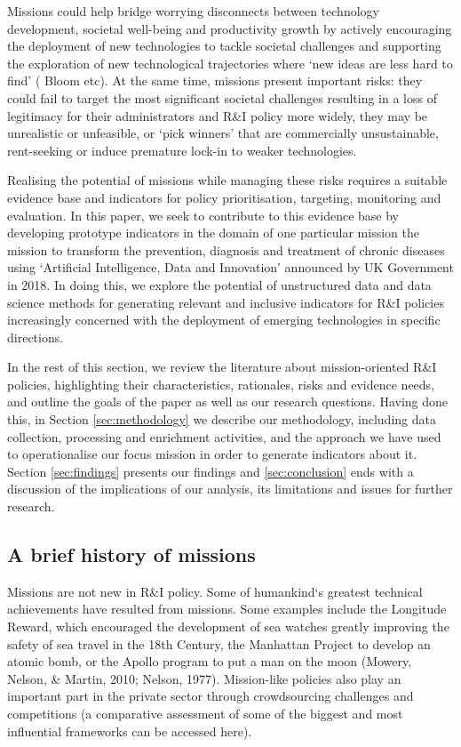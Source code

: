 \documentclass[11pt]{article}
\begin{document}
Missions could help bridge worrying disconnects between technology development, societal well-being and productivity growth by actively encouraging the deployment of new technologies to tackle societal challenges and supporting the exploration of new technological trajectories where `new ideas are less hard to find' ( Bloom etc). At the same time, missions present important risks: they could fail to target the most significant societal challenges resulting in a loss of legitimacy for their administrators and R\&I policy more widely, they may be unrealistic or unfeasible, or `pick winners' that are commercially unsustainable, rent-seeking or induce premature lock-in to weaker technologies. 

Realising the potential of missions while managing these risks requires a suitable evidence base and indicators for policy prioritisation, targeting, monitoring and evaluation. In this paper, we seek to contribute to this evidence base by developing prototype indicators in the domain of one particular mission \- the mission to transform the prevention, diagnosis and treatment of chronic diseases using `Artificial Intelligence, Data and Innovation' announced by UK Government in 2018. In doing this, we explore the potential of unstructured data and data science methods for generating relevant and inclusive indicators for R\&I policies increasingly concerned with the deployment of emerging technologies in specific directions. 

In the rest of this section, we review the literature about mission-oriented R\&I policies, highlighting their characteristics, rationales, risks and evidence needs, and outline the goals of the paper as well as our research questions. Having done this, in Section \ref{sec:methodology} we describe our methodology, including data collection, processing and enrichment activities, and the approach we have used to operationalise our focus mission in order to generate indicators about it. Section \ref{sec:findings} presents our findings and \ref{sec:conclusion} ends with a discussion of the implications of our analysis, its limitations and issues for further research.

\subsection{A brief history of missions}
\label{subsec: history}

Missions are not new in R\&I policy. Some of humankind`s greatest technical achievements have resulted from missions. Some examples include the Longitude Reward, which encouraged the development of sea watches greatly improving the safety of sea travel in the 18th Century, the Manhattan Project to develop an atomic bomb, or the Apollo program to put a man on the moon (Mowery, Nelson, \& Martin, 2010; Nelson, 1977). Mission-like policies also play an important part in the private sector through crowdsourcing challenges and competitions (a comparative assessment of some of the biggest and most influential frameworks can be accessed  here). 
\end{document}

